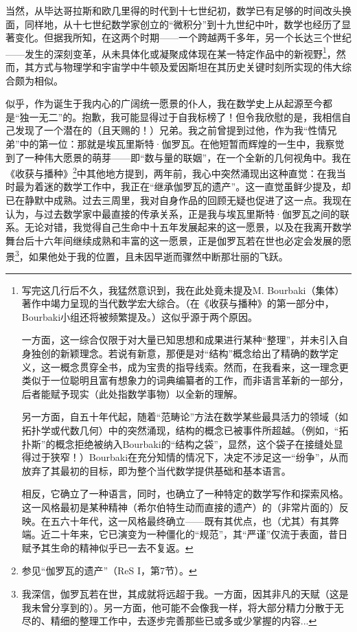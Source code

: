 当然，从毕达哥拉斯和欧几里得的时代到十七世纪初，数学已有足够的时间改头换面，同样地，从十七世纪数学家创立的“微积分”到十九世纪中叶，数学也经历了显著变化。但据我所知，在这两个时期——一个跨越两千多年，另一个长达三个世纪——发生的深刻变革，从未具体化或凝聚成体现在某一特定作品中的新视野\footnote{写完这几行后不久，我猛然意识到，我在此处竟未提及M. Bourbaki（集体）著作中竭力呈现的当代数学宏大综合。（在《收获与播种》的第一部分中，Bourbaki小组还将被频繁提及。）这似乎源于两个原因。

一方面，这一综合仅限于对大量已知思想和成果进行某种“整理”，并未引入自身独创的新颖理念。若说有新意，那便是对“结构”概念给出了精确的数学定义，这一概念贯穿全书，成为宝贵的指导线索。然而，在我看来，这一理念更类似于一位聪明且富有想象力的词典编纂者的工作，而非语言革新的一部分，后者能赋予现实（此处指数学事物）以全新的理解。

另一方面，自五十年代起，随着“范畴论”方法在数学某些最具活力的领域（如拓扑学或代数几何）中的突然涌现，结构的概念已被事件所超越。（例如，“拓扑斯”的概念拒绝被纳入Bourbaki的“结构之袋”，显然，这个袋子在接缝处显得过于狭窄！）Bourbaki在充分知情的情况下，决定不涉足这一“纷争”，从而放弃了其最初的目标，即为整个当代数学提供基础和基本语言。

相反，它确立了一种语言，同时，也确立了一种特定的数学写作和探索风格。这一风格最初是某种精神（希尔伯特生动而直接的遗产）的（非常片面的）反映。在五六十年代，这一风格最终确立——既有其优点，也（尤其）有其弊端。近二十年来，它已演变为一种僵化的“规范”，其“严谨”仅流于表面，昔日赋予其生命的精神似乎已一去不复返。}，然而，其方式与物理学和宇宙学中牛顿及爱因斯坦在其历史关键时刻所实现的伟大综合颇为相似。

似乎，作为诞生于我内心的广阔统一愿景的仆人，我在数学史上从起源至今都是“独一无二”的。抱歉，我可能显得过于自我标榜了！但令我欣慰的是，我相信自己发现了一个潜在的（且天赐的！）兄弟。我之前曾提到过他，作为我“性情兄弟”中的第一位：那就是埃瓦里斯特·伽罗瓦。在他短暂而辉煌的一生中，我察觉到了一种伟大愿景的萌芽——即“数与量的联姻”，在一个全新的几何视角中。我在《收获与播种》\footnote{参见“伽罗瓦的遗产”（ReS I，第7节）。}中其他地方提到，两年前，我心中突然涌现出这种直觉：在我当时最为着迷的数学工作中，我正在“继承伽罗瓦的遗产”。这一直觉虽鲜少提及，却已在静默中成熟。过去三周里，我对自身作品的回顾无疑也促进了这一点。我现在认为，与过去数学家中最直接的传承关系，正是我与埃瓦里斯特·伽罗瓦之间的联系。无论对错，我觉得自己生命中十五年发展起来的这一愿景，以及在我离开数学舞台后十六年间继续成熟和丰富的这一愿景，正是伽罗瓦若在世也必定会发展的愿景\footnote{我深信，伽罗瓦若在世，其成就将远超于我。一方面，因其非凡的天赋（这是我未曾分享到的）。另一方面，他可能不会像我一样，将大部分精力分散于无尽的、精细的整理工作中，去逐步完善那些已或多或少掌握的内容...}，如果他处于我的位置，且未因早逝而骤然中断那壮丽的飞跃。

